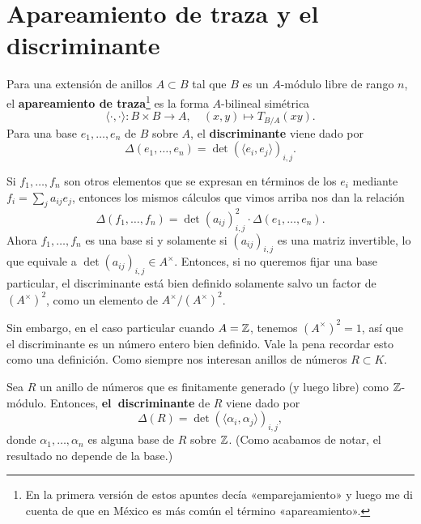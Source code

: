 
\section{Apareamiento de traza y el discriminante}

\begin{definicion}
  Para una extensión de anillos $A \subset B$ tal que $B$ es un $A$-módulo libre
  de rango $n$, el \textbf{apareamiento de traza}\footnote{En la primera
    versión de estos apuntes decía «emparejamiento» y luego me di cuenta de
    que en México es más común el término «apareamiento».}  es la forma
  $A$-bilineal simétrica
  \[ \langle\cdot,\cdot\rangle\colon B\times B\to A, \quad
     (x,y) \mapsto T_{B/A} (xy). \]
  Para una base $e_1,\ldots,e_n$ de $B$ sobre $A$, el \textbf{discriminante}
  viene dado por
  \[ \Delta (e_1,\ldots,e_n) =
     \det (\langle e_i,e_j\rangle)_{i,j}. \]
\end{definicion}

Si $f_1, \ldots, f_n$ son otros elementos que se expresan en términos de los
$e_i$ mediante $f_i = \sum_j a_{ij} e_j$, entonces los mismos cálculos que vimos
arriba nos dan la relación
\[ \Delta (f_1,\ldots,f_n) =
   \det (a_{ij})_{i,j}^2 \cdot \Delta (e_1,\ldots,e_n). \]
Ahora $f_1,\ldots,f_n$ es una base si y solamente si $(a_{ij})_{i,j}$ es una
matriz invertible, lo que equivale a $\det (a_{ij})_{i,j} \in A^\times$.
Entonces, si no queremos fijar una base particular, el discriminante está bien
definido solamente salvo un factor de $(A^\times)^2$, como un elemento de
$A^\times/(A^\times)^2$.

Sin embargo, en el caso particular cuando $A = \mathbb{Z}$, tenemos $(A^\times)^2 = 1$,
así que el discriminante es un número entero bien definido. Vale la pena
recordar esto como una definición. Como siempre nos interesan anillos de
números $R \subset K$.

\begin{definicion}
  Sea $R$ un anillo de números que es finitamente generado (y luego libre) como
  $\mathbb{Z}$-módulo. Entonces, \textbf{el~discriminante} de $R$ viene dado por
  $$\Delta (R) = \det (\langle \alpha_i, \alpha_j\rangle)_{i,j},$$
  donde $\alpha_1,\ldots,\alpha_n$ es alguna base de $R$ sobre $\mathbb{Z}$.
  (Como acabamos de notar, el resultado no depende de la base.)
\end{definicion}

